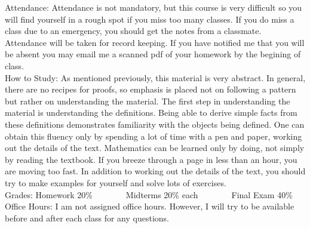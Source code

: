 \documentclass{article}
\begin{document}
	Attendance: Attendance is not mandatory, but this course is very difficult so you will find yourself in a rough spot if you miss too many classes. If you do miss a class due to an emergency, you should get the notes from a classmate. Attendance will be taken for record keeping. If you have notified me that you will be absent you may email me a scanned pdf of your homework by the begining of class. \\
	
	How to Study: As mentioned previously, this material is very abstract. In general, there are no recipes for proofs, so emphasis is placed not on following a pattern but rather on understanding the material.  The first step in understanding the material is understanding the definitions. Being able to derive simple facts from these definitions demonstrates familiarity with the objects being defined. One can obtain this fluency only by spending a lot of time with a pen and paper, working out the details of the text. Mathematics can be learned only by doing, not simply by reading the textbook. If you breeze through a page in less than an hour, you are moving too fast. In addition to working out the details of the text, you should try to make examples for yourself and solve lots of exercises.\\
	
	
	Grades: Homework 20\% 
	\newline\indent$\;\;\;\;\;\;\;\;\;\;\;\;$ Midterms 20\% each 
	\newline\indent$\;\;\;\;\;\;\;\;\;\;\;\;$ Final Exam 40\% \\
	
	Office Hours: I am not assigned office hours. However, I will try to be available before and after each class for any questions.
\end{document}
